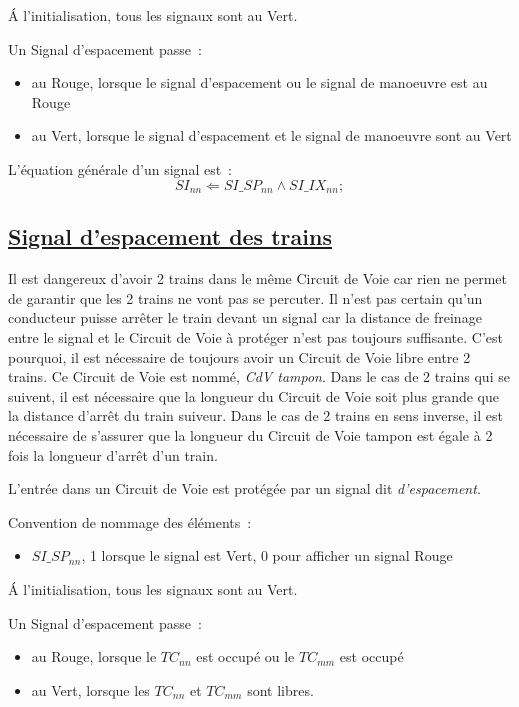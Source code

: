 \'A l'initialisation, tous les signaux sont au Vert.

Un Signal d'espacement passe~:
\begin{itemize}
\item au Rouge, lorsque le signal d'espacement ou le signal de
  manoeuvre est au Rouge
\item au Vert, lorsque le signal d'espacement et le signal de
  manoeuvre sont au Vert
\end{itemize}


\medskip
L'équation générale d'un signal est~:
$$\boxed{
  SI_{nn} \Leftarrow SI\_SP_{nn} \land SI\_IX_{nn};
}$$


\subsection{\underline{Signal d'espacement des trains}}
\label{sec:esp}

Il est dangereux d'avoir 2 trains dans le même Circuit de Voie car
rien ne permet de garantir que les 2 trains ne vont pas se
percuter. Il n'est pas certain qu'un conducteur puisse arrêter le
train devant un signal car la distance de freinage entre le signal et
le Circuit de Voie à protéger n'est pas toujours suffisante. C'est
pourquoi, il est nécessaire de toujours avoir un Circuit de Voie libre
entre 2 trains. Ce Circuit de Voie est nommé, \emph{CdV tampon}.  Dans
le cas de 2 trains qui se suivent, il est nécessaire que la longueur
du Circuit de Voie soit plus grande que la distance d'arrêt du train
suiveur.  Dans le cas de 2 trains en sens inverse, il est nécessaire
de s'assurer que la longueur du Circuit de Voie tampon est égale à 2
fois la longueur d'arrêt d'un train.

L'entrée dans un Circuit de Voie est protégée par un signal dit
\emph{d'espacement}.

Convention de nommage des éléments~:
\begin{itemize}
\item $SI\_SP_{nn}$, 1 lorsque le signal est Vert, 0 pour afficher un
  signal Rouge
\end{itemize}

\'A l'initialisation, tous les signaux sont au Vert.

Un Signal d'espacement passe~:
\begin{itemize}
\item au Rouge, lorsque le $TC_{nn}$ est occupé ou le $TC_{mm}$ est occupé
\item au Vert, lorsque les $TC_{nn}$ et $TC_{mm}$ sont libres.
\end{itemize}

